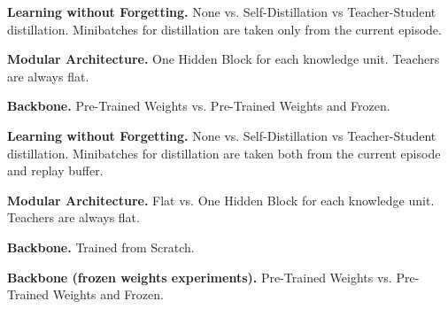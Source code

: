\noindent\textbf{Learning without Forgetting.} None vs. Self-Distillation vs Teacher-Student distillation. Minibatches for distillation are taken only from the current episode.

\noindent\textbf{Modular Architecture.} One Hidden Block for each knowledge unit. Teachers are always flat. 

\noindent\textbf{Backbone.} Pre-Trained Weights vs. Pre-Trained Weights and Frozen.

\noindent\textbf{Learning without Forgetting.} None vs. Self-Distillation vs Teacher-Student distillation. Minibatches for distillation are taken both from the current episode and replay buffer.

\noindent\textbf{Modular Architecture.} Flat vs. One Hidden Block for each knowledge unit. Teachers are always flat. 

\noindent\textbf{Backbone.} Trained from Scratch.

\noindent\textbf{Backbone (frozen weights experiments).} Pre-Trained Weights vs. Pre-Trained Weights and Frozen.